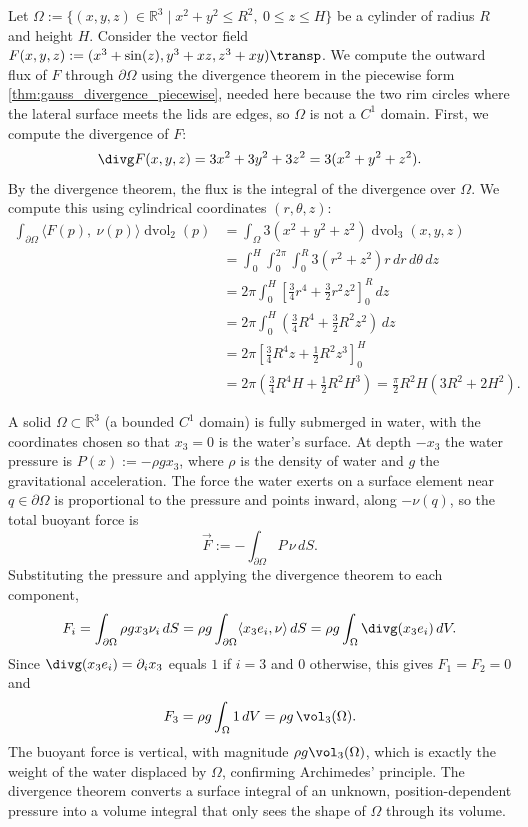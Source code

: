 \begin{example}
\label{ex:divergence_cylinder}
Let $\Omega := \{(x,y,z) \in \mathbb{R}^3 \mid x^2 + y^2 \leq R^2,\ 0 \leq z \leq H\}$ be a cylinder of radius $R$ and height $H$. Consider the vector field $F(x,y,z) := (x^3 + \sin(z), y^3 + xz, z^3 + xy)\transp$.
We compute the outward flux of $F$ through $\partial\Omega$ using the divergence theorem in
the piecewise form \cref{thm:gauss_divergence_piecewise}, needed here because the two rim circles
where the lateral surface meets the lids are edges, so $\Omega$ is not a $C^1$ domain.
First, we compute the divergence of $F$:
\[\divg F(x,y,z) = 3x^2 + 3y^2 + 3z^2 = 3(x^2 + y^2 + z^2).\]
By the divergence theorem, the flux is the integral of the divergence over $\Omega$. We compute this using cylindrical coordinates $(r, \theta, z)$:
\begin{align*}
\int_{\partial\Omega} \langle F(p),\ \nu(p)\rangle \mathop{d\text{vol}}_2(p) &= \int_\Omega 3(x^2 + y^2 + z^2) \mathop{d\text{vol}}_3(x,y,z) \\
&= \int_0^H \int_0^{2\pi} \int_0^R 3(r^2 + z^2) r \,dr\,d\theta\,dz \\
&= 2\pi \int_0^H \left[ \frac{3}{4}r^4 + \frac{3}{2}r^2 z^2 \right]_0^R \,dz \\
&= 2\pi \int_0^H \left( \frac{3}{4}R^4 + \frac{3}{2}R^2 z^2 \right) \,dz \\
&= 2\pi \left[ \frac{3}{4}R^4 z + \frac{1}{2}R^2 z^3 \right]_0^H \\
&= 2\pi \left( \frac{3}{4}R^4 H + \frac{1}{2}R^2 H^3 \right) = \frac{\pi}{2}R^2 H (3R^2 + 2H^2).
\end{align*}
\end{example}

\begin{example}
\label{ex:archimedes_principle}
A solid $\Omega \subset \mathbb{R}^3$ (a bounded $C^1$ domain) is fully submerged in water, with
the coordinates chosen so that $x_3=0$ is the water's surface. At depth $-x_3$ the water
pressure is $P(x) := -\rho gx_3$, where $\rho$ is the density of water and $g$ the gravitational
acceleration. The force the water exerts on a surface element near $q \in \partial\Omega$ is
proportional to the pressure and points inward, along $-\nu(q)$, so the total buoyant force is
\[\vec F := -\int_{\partial\Omega}P\,\nu\,dS.\]
Substituting the pressure and applying the divergence theorem to each component,
\[F_i = \int_{\partial\Omega}\rho gx_3\nu_i\,dS
  = \rho g\int_{\partial\Omega}\langle x_3e_i,\nu\rangle\,dS
  = \rho g\int_\Omega\divg(x_3e_i)\,dV.\]
Since $\divg(x_3e_i) = \partial_i x_3$ equals $1$ if $i=3$ and $0$ otherwise, this gives
$F_1=F_2=0$ and
\[F_3 = \rho g\int_\Omega 1\,dV = \rho g\,\vol_3(\Omega).\]
The buoyant force is vertical, with magnitude $\rho g\vol_3(\Omega)$, which is exactly the weight
of the water displaced by $\Omega$, confirming Archimedes' principle. The divergence theorem
converts a surface integral of an unknown, position-dependent pressure into a volume integral
that only sees the shape of $\Omega$ through its volume.
\end{example}

